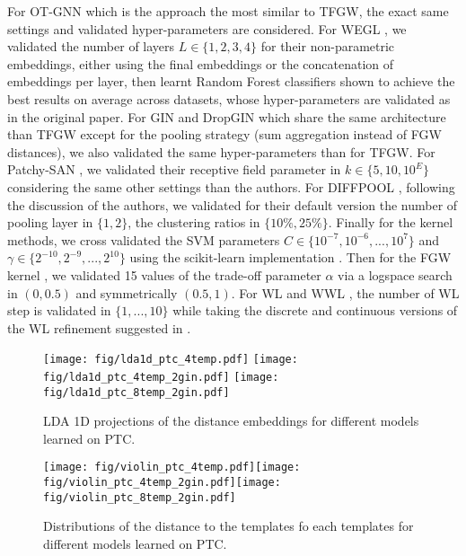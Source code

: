 \documentclass{article}
\begin{document}
{For OT-GNN \cite{chen2020optimal} which is the approach the most similar to TFGW, the exact same settings and validated hyper-parameters are considered. For WEGL \cite{kolouri2020wasserstein}, we validated the number of layers $L \in \{1,2,3,4\}$ for their non-parametric embeddings, either using the final embeddings or the concatenation of embeddings per layer, then learnt Random Forest classifiers shown to achieve the best results on average across datasets, whose hyper-parameters are validated as in the original paper. For GIN \cite{xu2018powerful} and DropGIN \cite{papp2021dropgnn} which share the same architecture than TFGW except for the pooling strategy (sum aggregation instead of FGW distances), we also validated the same hyper-parameters than for TFGW. For Patchy-SAN \cite{niepert2016learning}, we validated their receptive field parameter in $k \in \{5,10,10^E\}$ considering the same other settings than the authors. For DIFFPOOL \cite{ying2018hierarchical}, following the discussion of the authors, we validated for their default version the number of pooling layer in $\{1,2\}$, the clustering ratios in $\{10\%, 25\%\}$. Finally for the kernel methods, we cross validated the SVM parameters $C \in \{10^{-7}, 10^{-6},..., 10^7\}$ and $\gamma \in \{ 2^{-10}, 2^{-9},..., 2^{10}\}$ using the scikit-learn implementation \cite{sklearn_api}. Then for the FGW kernel \cite{titouan2019optimal}, we validated 15 values of the trade-off parameter $\alpha$ via a logspace search in $(0, 0.5)$ and symmetrically
$(0.5, 1)$. For WL \cite{shervashidze2011weisfeiler} and WWL \cite{Togninalli19}, the number of WL step is validated in $\{1,...,10\}$ while taking the discrete and continuous versions of the WL refinement suggested in \cite{Togninalli19}.

 
 \begin{figure}[t!]
 	\begin{center}
 		\texttt{[image: fig/lda1d\_ptc\_4temp.pdf]}\hspace{5mm}
 		\texttt{[image: fig/lda1d\_ptc\_4temp\_2gin.pdf]}\hspace{5mm}
 		\texttt{[image: fig/lda1d\_ptc\_8temp\_2gin.pdf]}
 	\end{center}\vspace{-2mm}
 	\caption{LDA 1D projections of the distance embeddings for different
 		models learned on PTC.\label{fig:lda} }
 \end{figure}
 \begin{figure}[t!]
 	\begin{center}
 		\texttt{[image: fig/violin\_ptc\_4temp.pdf]}\texttt{[image: fig/violin\_ptc\_4temp\_2gin.pdf]}\texttt{[image: fig/violin\_ptc\_8temp\_2gin.pdf]}
 	\end{center}\vspace{-2mm}
 	\caption{Distributions of the distance to the templates fo each templates
 		for different models learned on PTC.\label{fig:violin} }
 \end{figure}
 
}
\end{document}
